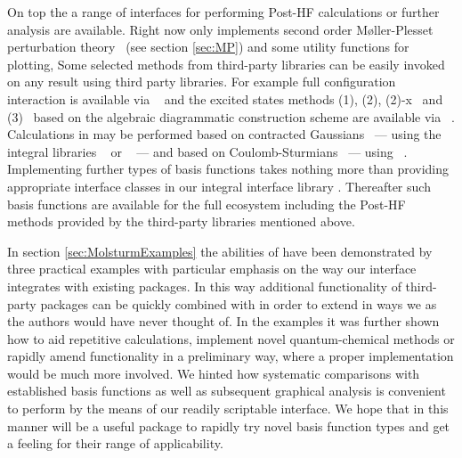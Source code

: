 On top the \SCF a range of interfaces for
performing Post-HF calculations or further analysis are available.
Right now \molsturm only implements second order Møller-Plesset perturbation theory%
~(see section \ref{sec:MP})
and some utility functions for plotting,
Some selected methods from third-party libraries can be easily
invoked on any \SCF result using third party libraries.
For example full configuration interaction is available via \pyscf~\cite{Sun2017}
and the excited states methods
\ADC(1), \ADC(2), \ADC(2)-x~\cite{Schirmer1982}
and \ADC(3)~\cite{Trofimov1999}
based on the algebraic diagrammatic construction scheme
are available via \adcman~\cite{Wormit2014}.
Calculations in \molsturm may be performed based on
contracted Gaussians~\cite{Hehre1969} --- using
the integral libraries \libint~\cite{Libint2_231,Libint2}
or \libcint~\cite{Sun2015} --- and based on
Coulomb-Sturmians~\cite{Shull1959,Avery2011} ---
using \sturmint~\cite{sturmintWeb}.
Implementing further types of basis functions
takes nothing more than providing appropriate interface classes in
our integral interface library \gint.
Thereafter such basis functions are available for the full \molsturm ecosystem
including the Post-HF methods
provided by the third-party libraries mentioned above.

In section \ref{sec:MolsturmExamples} the abilities of \molsturm
have been demonstrated
by three practical examples with particular emphasis
on the way our \python interface integrates with existing
\python packages.
In this way additional functionality of third-party packages can be quickly combined
with \molsturm in order to extend \molsturm in ways we as the authors
would have never thought of.
In the examples it was further shown how to aid repetitive calculations,
implement novel quantum-chemical methods
or rapidly amend functionality in a preliminary way,
where a proper implementation would be much more involved.
We hinted how
systematic comparisons with established basis functions
as well as subsequent graphical analysis
is convenient to perform by the means of our
readily scriptable interface.
We hope that in this manner \molsturm
will be a useful package to rapidly try novel basis function types
and get a feeling for their range of applicability.
